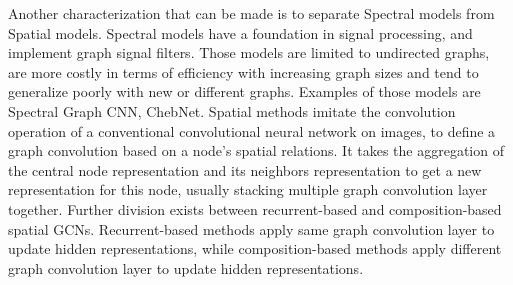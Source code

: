 \documentclass[a4paper]{article}
\begin{document}
Another characterization that can be made is to separate Spectral models from Spatial models. Spectral models have a foundation in signal processing, and implement graph signal filters. Those models are limited to undirected graphs, are more costly in terms of efficiency with increasing graph sizes and tend to generalize poorly with new or different graphs. Examples of those models are Spectral Graph CNN, ChebNet. Spatial methods imitate the convolution operation of a conventional convolutional neural network on images, to define a graph convolution based on a node's spatial relations. It takes the aggregation of the central node representation and its neighbors representation to get a new representation for this node, usually stacking multiple graph convolution layer together. Further division exists between recurrent-based and composition-based spatial GCNs. Recurrent-based methods apply same graph convolution layer to update hidden representations, while composition-based methods apply different graph convolution layer to update hidden representations.

\end{document}
